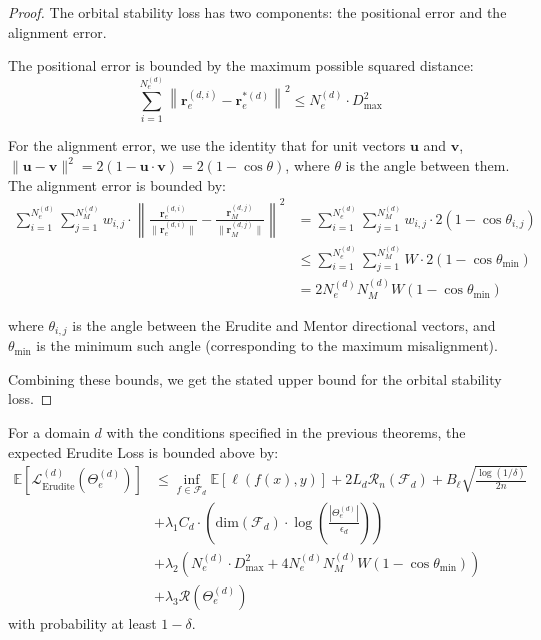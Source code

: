 \begin{proof}
The orbital stability loss has two components: the positional error and the alignment error.

The positional error is bounded by the maximum possible squared distance:
\begin{equation}
\sum_{i=1}^{N_e^{(d)}} \left\|\mathbf{r}_e^{(d,i)} - \mathbf{r}_e^{*(d)}\right\|^2 \leq N_e^{(d)} \cdot D_{\text{max}}^2
\end{equation}

For the alignment error, we use the identity that for unit vectors $\mathbf{u}$ and $\mathbf{v}$, $\|\mathbf{u} - \mathbf{v}\|^2 = 2(1 - \mathbf{u} \cdot \mathbf{v}) = 2(1 - \cos\theta)$, where $\theta$ is the angle between them. The alignment error is bounded by:
\begin{align}
\sum_{i=1}^{N_e^{(d)}} \sum_{j=1}^{N_M^{(d)}} w_{i,j} \cdot \left\|\frac{\mathbf{r}_e^{(d,i)}}{\|\mathbf{r}_e^{(d,i)}\|} - \frac{\mathbf{r}_M^{(d,j)}}{\|\mathbf{r}_M^{(d,j)}\|}\right\|^2 &= \sum_{i=1}^{N_e^{(d)}} \sum_{j=1}^{N_M^{(d)}} w_{i,j} \cdot 2(1 - \cos\theta_{i,j}) \\
&\leq \sum_{i=1}^{N_e^{(d)}} \sum_{j=1}^{N_M^{(d)}} W \cdot 2(1 - \cos\theta_{\text{min}}) \\
&= 2N_e^{(d)}N_M^{(d)}W(1 - \cos\theta_{\text{min}})
\end{align}

where $\theta_{i,j}$ is the angle between the Erudite and Mentor directional vectors, and $\theta_{\text{min}}$ is the minimum such angle (corresponding to the maximum misalignment).

Combining these bounds, we get the stated upper bound for the orbital stability loss.
\end{proof}

\begin{theorem}
For a domain $d$ with the conditions specified in the previous theorems, the expected Erudite Loss is bounded above by:
\begin{align}
\mathbb{E}[\mathcal{L}_{\text{Erudite}}^{(d)}(\Theta_e^{(d)})] &\leq \inf_{f \in \mathcal{F}_d} \mathbb{E}[\ell(f(x), y)] + 2L_d\mathcal{R}_n(\mathcal{F}_d) + B_{\ell}\sqrt{\frac{\log(1/\delta)}{2n}} \\
&+ \lambda_1 C_d \cdot \left(\text{dim}(\mathcal{F}_d) \cdot \log\left(\frac{|\Theta_e^{(d)}|}{\epsilon_d}\right)\right) \\
&+ \lambda_2 \left(N_e^{(d)} \cdot D_{\text{max}}^2 + 4N_e^{(d)}N_M^{(d)}W(1 - \cos\theta_{\text{min}})\right) \\
&+ \lambda_3 \mathcal{R}(\Theta_e^{(d)})
\end{align}
with probability at least $1-\delta$.
\end{theorem}

